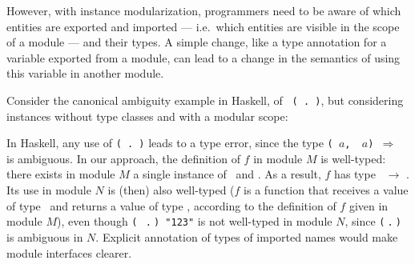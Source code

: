 However, with instance modularization, programmers need to be aware of
which entities are exported and imported --- i.e.~which entities are
visible in the scope of a module --- and their types.  A simple
change, like a type annotation for a variable exported from a module,
can lead to a change in the semantics of using this variable in
another module.

Consider the canonical ambiguity example in Haskell, of {\tt
  (\sshow\ $\!$.$\!$ \rread)}, but considering instances without type
classes and with a modular scope:


In Haskell, any use of {\tt (\sshow\ $\!$.$\!$ \rread)} leads to a
type error, since the type {\tt (\SShow\ $a$, \RRead\ $a$)
  $\Rightarrow$ \String} is ambiguous. In our approach, the definition
of $f$ in module $M$ is well-typed: there exists in module $M$ a
single instance of \myshow\ and \myread. As a result, $f$ has type
\String\ $\rightarrow$ \String. Its use in module $N$ is (then) also
well-typed ($f$ is a function that receives a value of type
\String\ and returns a value of type \String, according to the
definition of $f$ given in module $M$), even though {\tt (\myshow
  $\:$.$\:$\myread)\ "123"} is not well-typed in module $N$, since
{\tt (\myshow $\:$.$\:$\myread)} is ambiguous in $N$. Explicit
annotation of types of imported names would make module interfaces
clearer.



